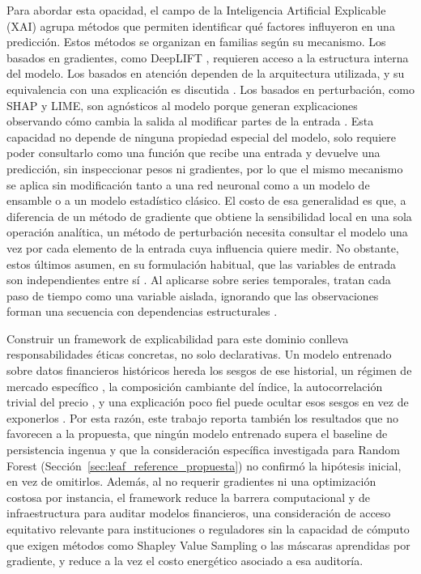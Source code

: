 Para abordar esta opacidad, el campo de la Inteligencia Artificial Explicable (XAI) agrupa métodos que permiten identificar qué factores influyeron en una predicción. Estos métodos se organizan en familias según su mecanismo. Los basados en gradientes, como DeepLIFT \cite{shrikumar2017}, requieren acceso a la estructura interna del modelo. Los basados en atención dependen de la arquitectura utilizada, y su equivalencia con una explicación es discutida \cite{jain2019}. Los basados en perturbación, como SHAP y LIME, son agnósticos al modelo porque generan explicaciones observando cómo cambia la salida al modificar partes de la entrada \cite{arsenault2025}. Esta capacidad no depende de ninguna propiedad especial del modelo, solo requiere poder consultarlo como una función que recibe una entrada y devuelve una predicción, sin inspeccionar pesos ni gradientes, por lo que el mismo mecanismo se aplica sin modificación tanto a una red neuronal como a un modelo de ensamble o a un modelo estadístico clásico. El costo de esa generalidad es que, a diferencia de un método de gradiente que obtiene la sensibilidad local en una sola operación analítica, un método de perturbación necesita consultar el modelo una vez por cada elemento de la entrada cuya influencia quiere medir. No obstante, estos últimos asumen, en su formulación habitual, que las variables de entrada son independientes entre sí \cite{lundberg2017, ribeiro2016}. Al aplicarse sobre series temporales, tratan cada paso de tiempo como una variable aislada, ignorando que las observaciones forman una secuencia con dependencias estructurales \cite{tonekaboni2020, huang2025}.

Construir un framework de explicabilidad para este dominio conlleva responsabilidades éticas concretas, no solo declarativas. Un modelo entrenado sobre datos financieros históricos hereda los sesgos de ese historial, un régimen de mercado específico \cite{angtimmermann2012}, la composición cambiante del índice, la autocorrelación trivial del precio \cite{fama1970, meese1983}, y una explicación poco fiel puede ocultar esos sesgos en vez de exponerlos \cite{rudin2019}. Por esta razón, este trabajo reporta también los resultados que no favorecen a la propuesta, que ningún modelo entrenado supera el baseline de persistencia ingenua y que la consideración específica investigada para Random Forest (Sección~\ref{sec:leaf_reference_propuesta}) no confirmó la hipótesis inicial, en vez de omitirlos. Además, al no requerir gradientes ni una optimización costosa por instancia, el framework reduce la barrera computacional y de infraestructura para auditar modelos financieros, una consideración de acceso equitativo relevante para instituciones o reguladores sin la capacidad de cómputo que exigen métodos como Shapley Value Sampling o las máscaras aprendidas por gradiente, y reduce a la vez el costo energético asociado a esa auditoría.

